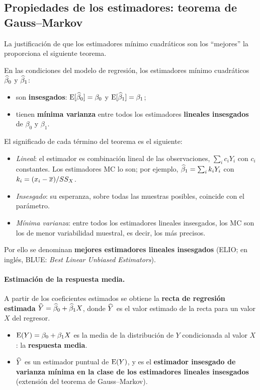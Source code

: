 \subsection{Propiedades de los estimadores: teorema de Gauss--Markov}

La justificación de que los estimadores mínimo cuadráticos son los ``mejores'' la proporciona
el siguiente teorema.

\begin{teorema}
  En las condiciones del modelo de regresión, los estimadores mínimo cuadráticos
  $\widehat{\beta}_0$ y $\widehat{\beta}_1$:
  \begin{itemize}
    \item son \textbf{insesgados}: $\operatorname{E}[\widehat{\beta}_0]=\beta_0$ y $\operatorname{E}[\widehat{\beta}_1]=\beta_1$;
    \item tienen \textbf{mínima varianza} entre todos los estimadores \textbf{lineales
      insesgados} de $\beta_0$ y $\beta_1$.
  \end{itemize}
\end{teorema}

El significado de cada término del teorema es el siguiente:
\begin{itemize}
  \item \emph{Lineal}: el estimador es combinación lineal de las observaciones,
    $\sum_i c_iY_i$ con $c_i$ constantes. Los estimadores MC lo son; por ejemplo,
    $\widehat{\beta}_1=\sum_i k_iY_i$ con $k_i=(x_i-\overline{x})/SS_X$.
  \item \emph{Insesgado}: su esperanza, sobre todas las muestras posibles, coincide con el
    parámetro.
  \item \emph{Mínima varianza}: entre todos los estimadores lineales insesgados, los MC son los
    de menor variabilidad muestral, es decir, los más precisos.
\end{itemize}
Por ello se denominan \textbf{mejores estimadores lineales insesgados} (ELIO; en inglés,
BLUE: \emph{Best Linear Unbiased Estimators}).

\paragraph{Estimación de la respuesta media.} A partir de los coeficientes estimados se obtiene
la \textbf{recta de regresión estimada} $\widehat{Y}=\widehat{\beta}_0+\widehat{\beta}_1X$, donde $\widehat{Y}$ es el
valor estimado de la recta para un valor $X$ del regresor.
\begin{itemize}
  \item $\operatorname{E}(Y)=\beta_0+\beta_1X$ es la media de la distribución de $Y$ condicionada al valor
    $X$: la \textbf{respuesta media}.
  \item $\widehat{Y}$ es un estimador puntual de $\operatorname{E}(Y)$, y es el \textbf{estimador insesgado de
    varianza mínima en la clase de los estimadores lineales insesgados} (extensión del teorema
    de Gauss--Markov).
\end{itemize}

